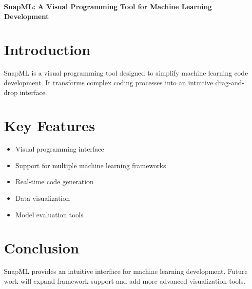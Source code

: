 \documentclass[a0paper,landscape]{article}
\begin{document}
\begin{center}
\Huge\textbf{SnapML: A Visual Programming Tool for Machine Learning Development}
\end{center}

\Large
\section{Introduction}
SnapML is a visual programming tool designed to simplify machine learning code development.
It transforms complex coding processes into an intuitive drag-and-drop interface.

\section{Key Features}
\begin{itemize}
\item Visual programming interface
\item Support for multiple machine learning frameworks
\item Real-time code generation
\item Data visualization
\item Model evaluation tools
\end{itemize}

\section{Conclusion}
SnapML provides an intuitive interface for machine learning development.
Future work will expand framework support and add more advanced visualization tools.
\end{document}
